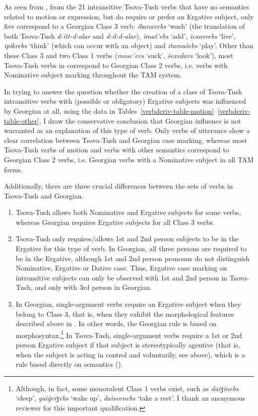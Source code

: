 As seen from , from the 21 intransitive Tsova-Tush verbs that have no semantics related to motion or expression, but do require or prefer an Ergative subject, only five correspond to a Georgian Class 3 verb: \textit{ibanavebs} `wash' (the translation of both Tsova-Tush \textit{d-itt-d-alar} and \textit{d-il-d-alar}), \textit{imat'ebs} `add', \textit{icxovrebs} `live', \textit{ipikrebs} `think' (which can occur with an object) and \textit{itamašebs} `play'. Other than these Class 3 and two Class 1 verbs (\textit{mosc'evs} `suck', \textit{šexedavs} `look'), most Tsova-Tush verbs in  correspond to Georgian Class 2 verbs, i.e. verbs with Nominative subject marking throughout the TAM system.

In trying to answer the question whether the creation of a class of Tsova-Tush intransitive verbs with (possible or obligatory) Ergative subjects was influenced by Georgian at all, using the data in Tables~\ref{verbderiv-table-motion}--\ref{verbderiv-table-other}, I draw the conservative conclusion that Georgian influence is not warranted as an explanation of this type of verb. Only verbs of utterance show a clear correlation between Tsova-Tush and Georgian case marking, whereas most Tsova-Tush verbs of motion and verbs with other semantics correspond to Georgian Class 2 verbs, i.e. Georgian verbs with a Nominative subject in all TAM forms.

Additionally, there are three crucial differences between the sets of verbs in Tsova-Tush and Georgian.
\begin{enumerate}
	\item Tsova-Tush allows both Nominative and Ergative subjects for some verbs, whereas Georgian requires Ergative subjects for all Class 3 verbs.
    
	\item Tsova-Tush only requires/allows 1st and 2nd person subjects to be in the Ergative for this type of verb. In Georgian, all three persons are required to be in the Ergative, although 1st and 2nd person pronouns do not distinguish Nominative, Ergative or Dative case. Thus, Ergative case marking on intransitive subjects can only be observed with 1st and 2nd person in Tsova-Tush, and only with 3rd person in Georgian.
    
	\item In Georgian, single-argument verbs require an Ergative subject when they belong to Class 3, that is, when they exhibit the morphological features described above in . In other words, the Georgian rule is based on morphosyntax.\footnote{Although, in fact, some monovalent Class 1 verbs exist, such as \textit{daiʒinebs} `sleep', \textit{gaiğviʒebs} `wake up', \textit{daisvenebs} `take a rest'. I thank an anonymous reviewer for this important qualification.} In Tsova-Tush, single-argument verbs require a 1st or 2nd person Ergative subject if that subject is stereotypically agentive (that is, when the subject is acting in control and voluntarily, see  above), which is a rule based directly on semantics (\cites[]{holisky87}).
\end{enumerate}

